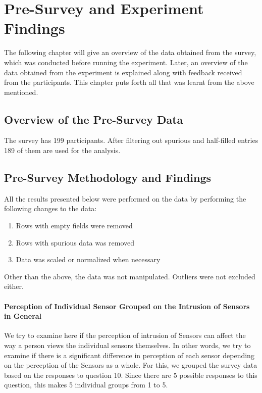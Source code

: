 
\chapter{Pre-Survey and Experiment Findings}
The following chapter will give an overview of the data obtained from the survey, which was conducted before running the experiment.
Later, an overview of the data obtained from the experiment is explained along with feedback received from the participants. This chapter puts forth
all that was learnt from the above mentioned.


\section{Overview of the Pre-Survey Data}
The survey has 199 participants. After filtering out spurious and half-filled entries 189 of them are used for the analysis.



\section{Pre-Survey Methodology and Findings}
All the results presented below were performed on the data by performing the following changes to the data:
\begin{enumerate}
\item Rows with empty fields were removed
\item Rows with spurious data was removed
\item Data was scaled or normalized when necessary
\end{enumerate}

Other than the above, the data was not manipulated. Outliers were not excluded either.

\subsubsection{Perception of Individual Sensor Grouped on the Intrusion of Sensors in General}
We try to examine here if the perception of intrusion  of Sensors can affect the way a person views the individual sensors themselves. In other
words, we try to examine if there is a significant difference in perception of each sensor depending on the perception of the Sensors as a whole.
For this, we grouped the survey data based on the responses to question 10. Since there are 5 possible responses to this question, this makes 5 individual groups from 1 to 5.

